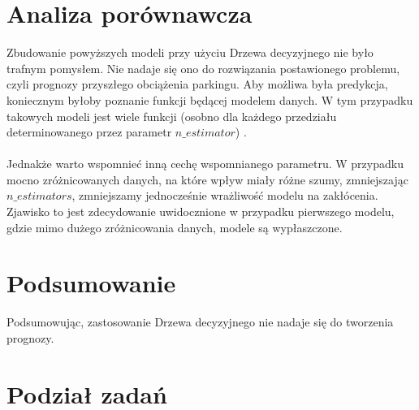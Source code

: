 \documentclass[]{article}
\begin{document}
\section{Analiza porównawcza}
Zbudowanie powyższych modeli przy użyciu Drzewa decyzyjnego nie było trafnym pomysłem. Nie nadaje się ono do rozwiązania postawionego problemu, czyli prognozy przyszłego obciążenia parkingu. Aby możliwa była predykcja, koniecznym byłoby poznanie funkcji będącej modelem danych. W tym przypadku takowych modeli jest wiele funkcji (osobno dla każdego przedziału determinowanego przez parametr $n\_estimator$) .\\
\\
Jednakże warto wspomnieć inną cechę wspomnianego parametru. W przypadku mocno zróżnicowanych danych, na które wpływ miały różne szumy, zmniejszając $n\_estimators$, zmniejszamy jednocześnie wrażliwość modelu na zakłócenia. Zjawisko to jest zdecydowanie uwidocznione w przypadku pierwszego modelu, gdzie mimo dużego zróżnicowania danych, modele są wypłaszczone.

\section{Podsumowanie}
Podsumowując, zastosowanie Drzewa decyzyjnego nie nadaje się do tworzenia prognozy.


\section{Podział zadań}
\end{document}

